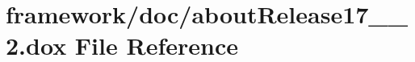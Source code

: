 \hypertarget{about_release17__07__2_8dox}{}\section{framework/doc/about\+Release17\+\_\+\_\+2.dox File Reference}
\label{about_release17__07__2_8dox}
